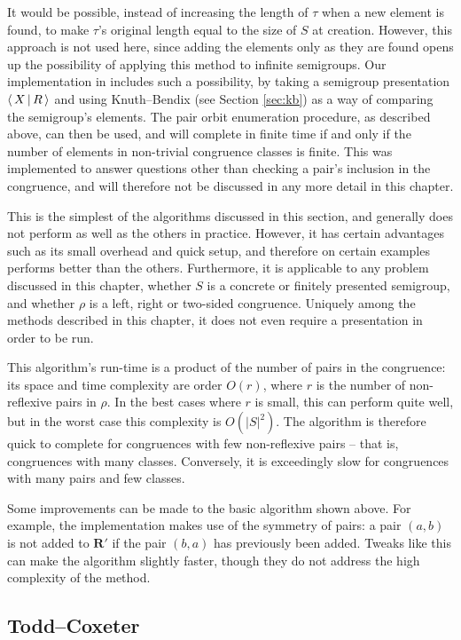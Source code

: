It would be possible, instead of increasing the length of $\tau$ when a new
element is found, to make $\tau$'s original length equal to the size of $S$ at
creation.  However, this approach is not used here, since adding the elements only as
they are found opens up the possibility of applying this method to infinite
semigroups.  Our implementation in \libsemigroups{} \cite{libsemigroups}
includes such a possibility, by taking a semigroup presentation $\left\langle\,X\,\middle|\,R\,\right\rangle$ and
using Knuth--Bendix (see Section \ref{sec:kb}) as a way of comparing the semigroup's
elements.  The pair orbit enumeration procedure, as described above, can then be
used, and will complete in finite time if and only if the number of elements in
non-trivial congruence classes is finite.  This was implemented to answer
questions other than checking a pair's inclusion in the congruence, and will
therefore not be discussed in any more detail in this chapter.

This is the simplest of the algorithms discussed in this section, and generally
does not perform as well as the others in practice.  However, it has certain
advantages such as its small overhead and quick setup, and therefore on certain
examples performs better than the others.  Furthermore, it is applicable to any
problem discussed in this chapter, whether $S$ is a concrete or finitely
presented semigroup, and whether $\rho$ is a left, right or two-sided
congruence.  Uniquely among the methods described in this chapter, it does not
even require a presentation in order to be run.

This algorithm's run-time is a product of the number of pairs in the congruence:
its space and time complexity are order $O(r)$, where $r$ is the number of
non-reflexive pairs in $\rho$.  In the best cases where $r$ is small, this can
perform quite well, but in the worst case this complexity is $O(|S|^2)$.
The algorithm is therefore quick to complete for congruences with few
non-reflexive pairs -- that is, congruences with many classes.  Conversely, it is
exceedingly slow for congruences with many pairs and few classes.

Some improvements can be made to the basic algorithm shown above.  For example,
the \libsemigroups{} implementation makes use of the symmetry of pairs: a
pair $(a,b)$ is not added to $\mathbf{R}'$ if the pair $(b,a)$ has previously
been added.  Tweaks like this can make the algorithm slightly faster, though
they do not address the high complexity of the method.

\subsection{Todd--Coxeter}
\label{sec:tc}

